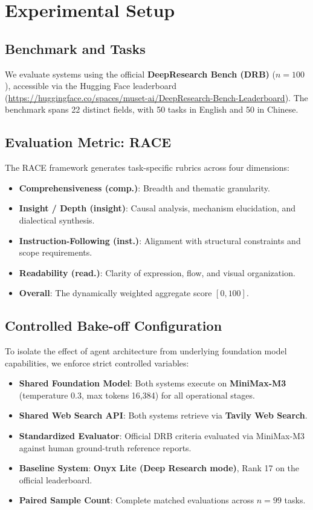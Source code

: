 \documentclass[11pt,a4paper]{article}
\begin{document}
\section{Experimental Setup}

\subsection{Benchmark and Tasks}
We evaluate systems using the official \textbf{DeepResearch Bench (DRB)} \cite{deepresearchbench2025,deepresearchbench22026} ($n=100$), accessible via the Hugging Face leaderboard (\url{https://huggingface.co/spaces/muset-ai/DeepResearch-Bench-Leaderboard}). The benchmark spans 22 distinct fields, with 50 tasks in English and 50 in Chinese.

\subsection{Evaluation Metric: RACE}
The RACE framework generates task-specific rubrics across four dimensions:
\begin{itemize}
    \item \textbf{Comprehensiveness (comp.)}: Breadth and thematic granularity.
    \item \textbf{Insight / Depth (insight)}: Causal analysis, mechanism elucidation, and dialectical synthesis.
    \item \textbf{Instruction-Following (inst.)}: Alignment with structural constraints and scope requirements.
    \item \textbf{Readability (read.)}: Clarity of expression, flow, and visual organization.
    \item \textbf{Overall}: The dynamically weighted aggregate score $[0, 100]$.
\end{itemize}

\subsection{Controlled Bake-off Configuration}
To isolate the effect of agent architecture from underlying foundation model capabilities, we enforce strict controlled variables:
\begin{itemize}
    \item \textbf{Shared Foundation Model}: Both systems execute on \textbf{MiniMax-M3} (temperature 0.3, max tokens 16,384) for all operational stages.
    \item \textbf{Shared Web Search API}: Both systems retrieve via \textbf{Tavily Web Search}.
    \item \textbf{Standardized Evaluator}: Official DRB criteria evaluated via MiniMax-M3 against human ground-truth reference reports.
    \item \textbf{Baseline System}: \textbf{Onyx Lite (Deep Research mode)}, Rank 17 on the official leaderboard.
    \item \textbf{Paired Sample Count}: Complete matched evaluations across $n=99$ tasks.
\end{itemize}
\end{document}
